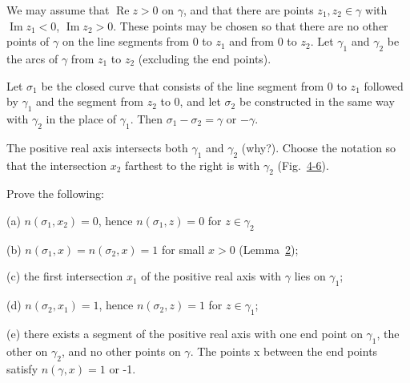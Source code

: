 We may assume that $\operatorname{Re} z > 0$ on $\gamma$, and that there are points $z_1, z_2 \in \gamma$ with $\operatorname{Im} z_1 < 0$, $\operatorname{Im} z_2 > 0$. These points may be chosen so that there are no other points of $\gamma$ on the line segments from 0 to $z_1$ and from 0 to $z_2$. Let $\gamma_1$ and $\gamma_2$ be the arcs of $\gamma$ from $z_1$ to $z_2$ (excluding the end points).

Let $\sigma_{1}$ be the closed curve that consists of the line segment from 0 to $z_{1}$ followed by $\gamma_{1}$ and the segment from $z_{2}$ to 0, and let $\sigma_{2}$ be constructed in the same way with $\gamma_{2}$ in the place of $\gamma_{1}$. Then $\sigma_{1} - \sigma_{2} = \gamma$ or $-\gamma$.

The positive real axis intersects both $\gamma_{1}$ and $\gamma_{2}$ (why?). Choose the notation so that the intersection $x_{2}$ farthest to the right is with $\gamma_{2}$ (Fig.~\hyperref[fig:4-6]{4-6}).

Prove the following:

(a) $n(\sigma_1,x_2) = 0$, hence $n(\sigma_1,z) = 0$ for $z\in \gamma_{2}$

(b) $n(\sigma_1,x) = n(\sigma_2,x) = 1$ for small $x > 0$ (Lemma~\hyperref[lem:4.2]{2});

(c) the first intersection $x_{1}$ of the positive real axis with $\gamma$ lies on $\gamma_{1}$;

(d) $n(\sigma_2, x_1) = 1$, hence $n(\sigma_2, z) = 1$ for $z \in \gamma_1$;

(e) there exists a segment of the positive real axis with one end point on $\gamma_{1}$, the other on $\gamma_{2}$, and no other points on $\gamma$. The points x between the end points satisfy $n(\gamma,x)=1$ or -1.

